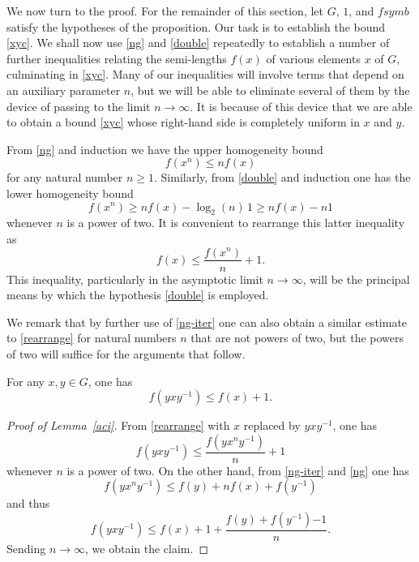 \begin{proposition}
We now turn to the proof. For the remainder of this section, let $G$,
{ $1$}, and $fsymb$ satisfy the hypotheses of the
proposition.  Our task is to establish the bound \eqref{xyc}.  We shall
now use \eqref{ng} and \eqref{double} repeatedly to establish a number of
further inequalities relating the { semi-}lengths $f(x)$ of various
elements $x$ of $G$, culminating in \eqref{xyc}.
Many of our inequalities will involve terms that depend on an auxiliary
parameter $n$, but we will be able to eliminate several of them by the
device of passing to the limit $n \to \infty$.  It is because of this
device that we are able to obtain a bound \eqref{xyc} whose right-hand
side is completely uniform in $x$ and $y$.

From \eqref{ng} and induction we have the upper homogeneity
bound
\begin{equation}\label{ng-iter}
	f(x^n) \leq { n f(x)}
\end{equation}
for any natural number $n \geq 1$.  Similarly, from \eqref{double} and
induction one has the lower homogeneity bound
\[
	f(x^n) \geq { n f(x) - \log_2(n)\, 1 \geq n f(x) - n 1}
\]
whenever $n$ is a power of two.  It is convenient to rearrange this
latter inequality as
\begin{equation}\label{rearrange}
	f(x) \leq \frac{f(x^n)}{n}  + { 1}.
\end{equation}
This inequality, particularly in the asymptotic limit $n \to \infty$,
will be the principal means by which the hypothesis \eqref{double} is
employed.

We remark that by further use of \eqref{ng-iter} one can also obtain a
similar estimate to \eqref{rearrange} for natural numbers $n$ that are
not powers of two, but the powers of two will suffice for the
arguments that follow.

\begin{lemma}\label{aci}
	For any $x,y \in G$, one has
	\[
		f(yxy^{-1} ) \leq { f( x ) + 1}.
	\]
\end{lemma}

\begin{proof}[Proof of Lemma~\ref{aci}]
	From \eqref{rearrange} with $x$ replaced by $yxy^{-1}$, one has
	\[
		f(yxy^{-1}) \leq \frac{f(y x^n y^{-1}) }{n} + { 1}
	\]
	whenever $n$ is a power of two.  On the other hand, from \eqref{ng-iter}
	and \eqref{ng} one has
	\[
		f( y x^n y^{-1} ) \leq f(y) + n f(x) + f(y^{-1})
	\]
	and thus
	\[
		f(yxy^{-1}) \leq f(x) + { 1} + \frac{f(y) +
			f(y^{-1}) { - 1}}{n}.
	\]
	Sending $n \to \infty$, we obtain the claim.
\end{proof}



\end{proposition}
